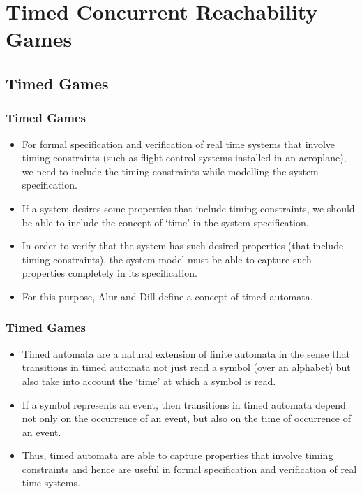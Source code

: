 \documentclass{beamer}
\begin{document}
\section[Timed Concurrent Reachability Games]{Timed Concurrent Reachability Games}
\subsection*{Timed Games}
\begin{frame}
\frametitle{Timed Games}
  \begin{itemize}
	\item For formal specification and verification of real time systems that involve timing constraints (such as flight control systems installed in an aeroplane), we need to include the timing constraints while modelling the system specification.
 	\item If a system desires some properties that include timing constraints, we should be able to include the concept of `time' in the system specification.
 	\item In order to verify that the system has such desired properties (that include timing constraints), the system model must be able to capture such properties completely in its specification. 
 	\item For this purpose, Alur and Dill \cite{1} define a concept of timed automata.
  \end{itemize}
\end{frame}

\begin{frame}
\frametitle{Timed Games}
  \begin{itemize}
	\item Timed automata are a natural extension of finite automata in the sense that transitions in timed automata not just read a symbol (over an alphabet) but also take into account the `time' at which a symbol is read.
 	\item If a symbol represents an event, then transitions in timed automata depend not only on the occurrence of an event, but also on the time of occurrence of an event.
 	\item Thus, timed automata are able to capture properties that involve timing constraints and hence are useful in formal specification and verification of real time systems. 
  \end{itemize}
\end{frame}
\end{document}
